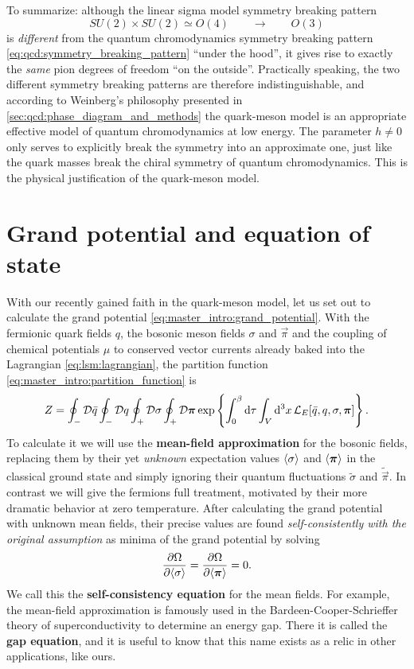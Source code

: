 To summarize: although the linear sigma model symmetry breaking pattern
\begin{equation}
	SU(2) \times SU(2) \simeq O(4) \qquad \longrightarrow \qquad O(3)
\end{equation}
is \emph{different} from the quantum chromodynamics symmetry breaking pattern \eqref{eq:qcd:symmetry_breaking_pattern} ``under the hood'',
it gives rise to exactly the \emph{same} pion degrees of freedom ``on the outside''.
Practically speaking, the two different symmetry breaking patterns are therefore indistinguishable,
and according to Weinberg's philosophy presented in \cref{sec:qcd:phase_diagram_and_methods}
the quark-meson model is an appropriate effective model of quantum chromodynamics at low energy.
The parameter $h \neq 0$ only serves to explicitly break the symmetry into an approximate one,
just like the quark masses break the chiral symmetry of quantum chromodynamics.
This is the physical justification of the quark-meson model.

\section{Grand potential and equation of state}

With our recently gained faith in the quark-meson model,
let us set out to calculate the grand potential \eqref{eq:master_intro:grand_potential}.
With the fermionic quark fields $q$, the bosonic meson fields $\sigma$ and $\vec\pi$
and the coupling of chemical potentials $\mu$ to conserved vector currents already baked into the Lagrangian \eqref{eq:lsm:lagrangian},
the partition function \eqref{eq:master_intro:partition_function} is
\begin{equation}
	Z = \oint_- \mathcal{D} \bar{q} \oint_- \mathcal{D} q \oint_+ \mathcal{D} \sigma \oint_+ \mathcal{D} {\bm{\pi}} \exp \left\{ \int_0^\beta \mathop{}\!\mathrm{d} \tau \int_V \mathop{}\!\mathrm{d}^3 x \, \mathcal{L}_E[\bar{q}, q, \sigma, {\bm{\pi}}]  \right\} .
\end{equation}
To calculate it we will use the \textbf{mean-field approximation} for the bosonic fields,
replacing them by their yet \emph{unknown} expectation values $\langle \sigma \rangle$ and $\langle {\bm{\pi}} \rangle$ in the classical ground state
and simply ignoring their quantum fluctuations $\tilde{\sigma}$ and $\tilde{\vec\pi}$.
In contrast we will give the fermions full treatment,
motivated by their more dramatic behavior at zero temperature.
After calculating the grand potential with unknown mean fields,
their precise values are found \emph{self-consistently with the original assumption} as minima of the grand potential by solving
\begin{equation}
	\pdv{\Omega}{ \langle \sigma \rangle} = \pdv{\Omega}{ \langle {\bm{\pi}} \rangle} = 0.
\label{eq:lsm:gap_equation}
\end{equation}
We call this the \textbf{self-consistency equation} for the mean fields.
For example, the mean-field approximation is famously used in the Bardeen-Cooper-Schrieffer theory of superconductivity to determine an energy gap.
There it is called the \textbf{gap equation}, and it is useful to know that this name exists as a relic in other applications, like ours.


